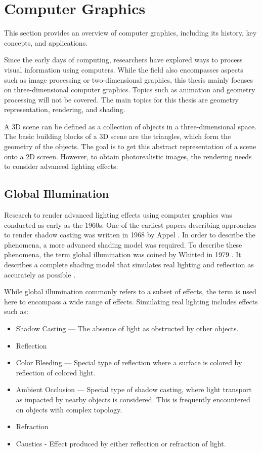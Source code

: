 \section{Computer Graphics}
\label{ch:computerGraphics}

This section provides an overview of computer graphics, including its history, key concepts, and applications.

Since the early days of computing, researchers have explored ways to process visual information using computers. While the field also encompasses aspects such as image processing or two-dimensional graphics, this thesis mainly focuses on three-dimensional computer graphics. Topics such as animation and geometry processing will not be covered. The main topics for this thesis are geometry representation, rendering, and shading.

A 3D scene can be defined as a collection of objects in a three-dimensional space. The basic building blocks of a 3D scene are the triangles, which form the geometry of the objects. The goal is to get this abstract representation of a scene onto a 2D screen. However, to obtain photorealistic images, the rendering needs to consider advanced lighting effects.

\subsection{Global Illumination}

Research to render advanced lighting effects using computer graphics was conducted as early as the 1960s. One of the earliest papers describing approaches to render shadow casting was written in 1968 by Appel \cite{appel1968shading}. In order to describe the phenomena, a more advanced shading model was required. To describe these phenomena, the term global illumination was coined by Whitted in 1979 \cite{whittedGlobalIllumination}. It describes a complete shading model that simulates real lighting and reflection as accurately as possible \cite{whitted2020OriginsOfGlobalIllumination}.

While global illumination commonly refers to a subset of effects, the term is used here to encompass a wide range of effects. Simulating real lighting includes effects such as:

\begin{itemize}
  \item{Shadow Casting} — The absence of light as obstructed by other objects.
  \item{Reflection}
  \item{Color Bleeding} — Special type of reflection where a surface is colored by reflection of colored light.
  \item{Ambient Occlusion} — Special type of shadow casting, where light transport as impacted by nearby objects is considered. This is frequently encountered on objects with complex topology.
  \item{Refraction}
  \item{Caustics} - Effect produced by either reflection or refraction of light.
\end{itemize}

